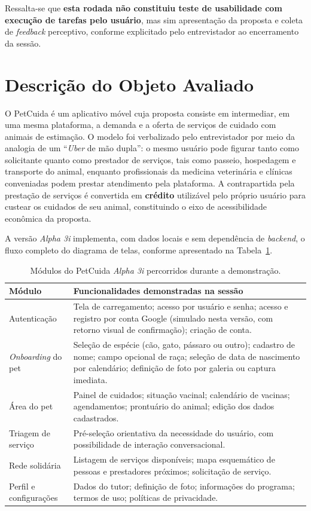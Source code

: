 \documentclass[12pt,a4paper]{article}
\begin{document}
Ressalta-se que \textbf{esta rodada não constituiu teste de usabilidade com execução de
tarefas pelo usuário}, mas sim apresentação da proposta e coleta de \textit{feedback}
perceptivo, conforme explicitado pelo entrevistador ao encerramento da sessão.

\section{Descrição do Objeto Avaliado}

O PetCuida é um aplicativo móvel cuja proposta consiste em intermediar, em uma mesma
plataforma, a demanda e a oferta de serviços de cuidado com animais de estimação. O modelo
foi verbalizado pelo entrevistador por meio da analogia de um \enquote{\textit{Uber} de mão
dupla}: o mesmo usuário pode figurar tanto como solicitante quanto como prestador de
serviços, tais como passeio, hospedagem e transporte do animal, enquanto profissionais
da medicina veterinária e clínicas conveniadas podem prestar atendimento pela plataforma.
A contrapartida pela prestação de serviços é convertida em \textbf{crédito} utilizável pelo
próprio usuário para custear os cuidados de seu animal, constituindo o eixo de acessibilidade
econômica da proposta.

A versão \textit{Alpha 3i} implementa, com dados locais e sem dependência de
\textit{backend}, o fluxo completo do diagrama de telas, conforme apresentado na
Tabela~\ref{tab:modulos}.

\begin{table}[h!]
\centering
\small
\begin{tabular}{@{}>{\raggedright\arraybackslash}p{4.2cm}>{\raggedright\arraybackslash}p{9.5cm}@{}}
\toprule
\textbf{Módulo} & \textbf{Funcionalidades demonstradas na sessão} \\
\midrule
Autenticação & Tela de carregamento; acesso por usuário e senha; acesso e registro por conta Google (simulado nesta versão, com retorno visual de confirmação); criação de conta. \\
\textit{Onboarding} do pet & Seleção de espécie (cão, gato, pássaro ou outro); cadastro de nome; campo opcional de raça; seleção de data de nascimento por calendário; definição de foto por galeria ou captura imediata. \\
Área do pet & Painel de cuidados; situação vacinal; calendário de vacinas; agendamentos; prontuário do animal; edição dos dados cadastrados. \\
Triagem de serviço & Pré-seleção orientativa da necessidade do usuário, com possibilidade de interação conversacional. \\
Rede solidária & Listagem de serviços disponíveis; mapa esquemático de pessoas e prestadores próximos; solicitação de serviço. \\
Perfil e configurações & Dados do tutor; definição de foto; informações do programa; termos de uso; políticas de privacidade. \\
\bottomrule
\end{tabular}
\caption{Módulos do PetCuida \textit{Alpha 3i} percorridos durante a demonstração.}
\label{tab:modulos}
\end{table}
\end{document}
